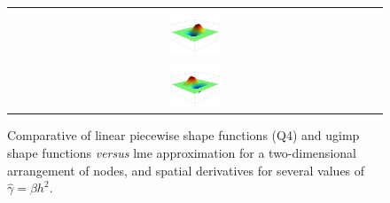 \documentclass[preprint,12pt,a4paper]{elsarticle}
\begin{document}
\begin{figure}
{\begin{tabular}{c}
      \includegraphics[width=0.14\textwidth]{Figures-GIMP-Shape-Fun-dx}\\
      \includegraphics[width=0.14\textwidth]{Figures-GIMP-Shape-Fun-dy}
    \end{tabular}
  }
  \caption{Comparative of linear piecewise shape functions (Q4) and
    \acrshort{ugimp} shape functions \textit{versus}  \acrshort{lme}
    approximation for a two-dimensional arrangement of nodes, and
    spatial derivatives for several values of $\widehat{\gamma} = \beta h^2$.}
  \label{fig:LME_MPM}
\end{figure}
\end{document}
